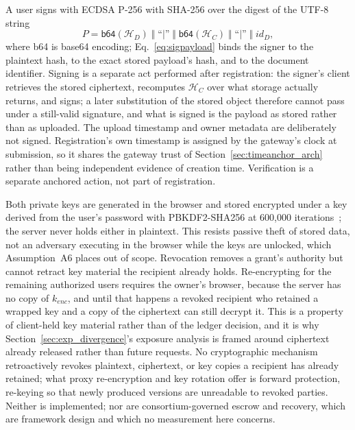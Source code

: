 \documentclass[preprint,12pt]{elsarticle}
\begin{document}
A user signs with ECDSA P-256 with SHA-256 over the digest of the UTF-8
string
\begin{equation}
  P = \textsf{b64}(\mathcal{H}_D) \;\Vert\; \text{``}|\text{''}
      \;\Vert\; \textsf{b64}(\mathcal{H}_C) \;\Vert\; \text{``}|\text{''}
      \;\Vert\; \mathit{id}_D,
  \label{eq:sigpayload}
\end{equation}
where \textsf{b64} is base64 encoding; Eq.~\ref{eq:sigpayload} binds the
signer to the plaintext hash, to the exact stored payload's hash, and to the
document identifier.
Signing is a separate act performed after registration: the
signer's client retrieves the stored ciphertext, recomputes
$\mathcal{H}_C$ over what storage actually returns, and signs; a later
substitution of the stored object therefore cannot pass under a still-valid
signature, and what is signed is the payload as stored rather than as
uploaded. The upload timestamp and owner metadata are deliberately not
signed. Registration's own timestamp is assigned by the gateway's clock at
submission, so it shares the gateway trust of Section~\ref{sec:timeanchor_arch}
rather than being independent evidence of creation time. Verification is a
separate anchored action, not part of registration.

\label{sec:keylifecycle}%
Both private keys are generated in the browser and stored encrypted under a key
derived from the user's password with PBKDF2-SHA256 at 600{,}000
iterations~\cite{owaspPasswordStorage2024,nist800132}; the server never holds
either in plaintext. This resists passive theft of stored data, not an adversary
executing in the browser while the keys are unlocked, which Assumption~A6 places
out of scope. Revocation removes a grant's authority but cannot retract key material the
recipient already holds. Re-encrypting for the remaining authorized users
requires the owner's browser, because the server has no copy of $k_{enc}$, and
until that happens a revoked recipient who retained a wrapped key and a copy of
the ciphertext can still decrypt it. This is a property of client-held key
material rather than of the ledger decision, and it is why
Section~\ref{sec:exp_divergence}'s exposure analysis is framed around ciphertext
already released rather than future requests. No cryptographic mechanism retroactively revokes plaintext, ciphertext, or
key copies a recipient has already retained; what proxy re-encryption and
key rotation offer is forward protection, re-keying so that newly produced
versions are unreadable to revoked parties. Neither is implemented; nor are
consortium-governed escrow and recovery, which are framework
design and which no measurement here concerns.
\end{document}
